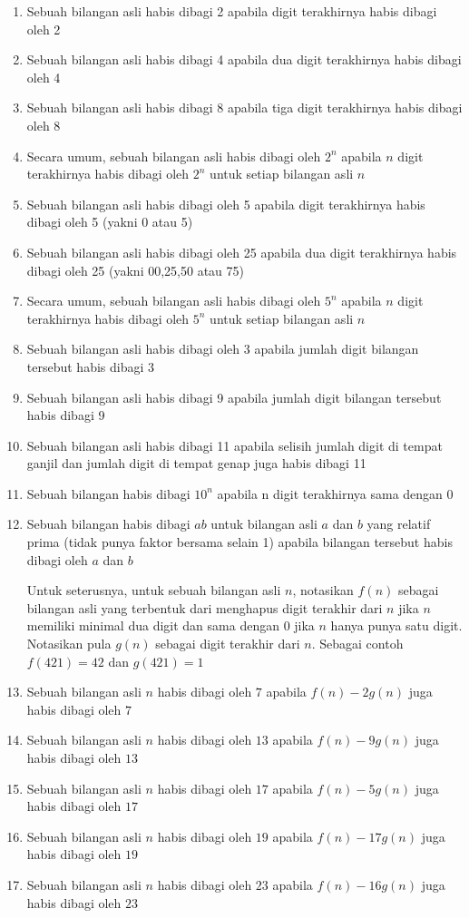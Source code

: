 \documentclass[11pt]{scrartcl}
\begin{document}
\begin{enumerate}
    \item Sebuah bilangan asli habis dibagi 2 apabila digit terakhirnya habis dibagi oleh 2
    \item Sebuah bilangan asli habis dibagi 4 apabila dua digit terakhirnya habis dibagi oleh 4
    \item Sebuah bilangan asli habis dibagi 8 apabila tiga digit terakhirnya habis dibagi oleh 8
    \item Secara umum, sebuah bilangan asli habis dibagi oleh $2^n$ apabila $n$ digit terakhirnya habis dibagi oleh $2^n$ untuk setiap bilangan asli $n$
    \item Sebuah bilangan asli habis dibagi oleh 5 apabila digit terakhirnya habis dibagi oleh 5 (yakni 0 atau 5)
    \item Sebuah bilangan asli habis dibagi oleh 25 apabila dua digit terakhirnya habis dibagi oleh 25 (yakni 00,25,50 atau 75)
    \item Secara umum, sebuah bilangan asli habis dibagi oleh $5^n$ apabila $n$ digit terakhirnya habis dibagi oleh $5^n$ untuk setiap bilangan asli $n$
    \item Sebuah bilangan asli habis dibagi oleh $3$ apabila jumlah digit bilangan tersebut habis dibagi $3$
    \item Sebuah bilangan asli habis dibagi 9 apabila jumlah digit bilangan tersebut habis dibagi 9
    \item Sebuah bilangan asli habis dibagi 11 apabila selisih jumlah digit di tempat ganjil dan jumlah digit di tempat genap juga habis dibagi 11
    \item Sebuah bilangan habis dibagi $10^n$ apabila n digit terakhirnya sama dengan 0
    \item Sebuah bilangan habis dibagi $ab$ untuk bilangan asli $a$ dan $b$ yang relatif prima (tidak punya faktor bersama selain 1) apabila bilangan tersebut habis dibagi oleh $a$ dan $b$
    
    Untuk seterusnya, untuk sebuah bilangan asli $n$, notasikan $f(n)$ sebagai bilangan asli yang terbentuk dari menghapus digit terakhir dari $n$ jika $n$ memiliki minimal dua digit dan sama dengan $0$ jika $n$ hanya punya satu digit. Notasikan pula $g(n)$ sebagai digit terakhir dari $n$. Sebagai contoh $f(421)=42$ dan $g(421)=1$

    \item Sebuah bilangan asli $n$ habis dibagi oleh $7$ apabila $f(n)-2g(n)$ juga habis dibagi oleh $7$
    \item Sebuah bilangan asli $n$ habis dibagi oleh $13$ apabila $f(n)-9g(n)$ juga habis dibagi oleh $13$
    \item Sebuah bilangan asli $n$ habis dibagi oleh $17$ apabila $f(n)-5g(n)$ juga habis dibagi oleh $17$
    \item Sebuah bilangan asli $n$ habis dibagi oleh $19$ apabila $f(n)-17g(n)$ juga habis dibagi oleh $19$
    \item Sebuah bilangan asli $n$ habis dibagi oleh $23$ apabila $f(n)-16g(n)$ juga habis dibagi oleh $23$
\end{enumerate}
\end{document}
